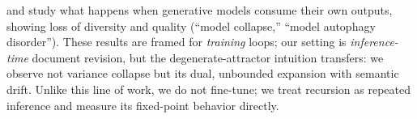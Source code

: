  \citet{shumailov2023curse} and
\citet{alemohammad2023selfconsuming} study what happens when generative models consume their
own outputs, showing loss of diversity and quality (``model collapse,'' ``model autophagy
disorder''). These results are framed for \emph{training} loops; our setting is
\emph{inference-time} document revision, but the degenerate-attractor intuition transfers: we
observe not variance collapse but its dual, unbounded expansion with semantic drift. Unlike
this line of work, we do not fine-tune; we treat recursion as repeated inference and measure
its fixed-point behavior directly.
